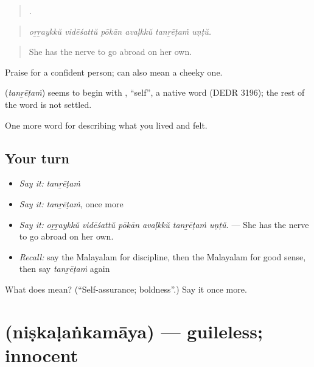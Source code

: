 \begin{quote}
     .
\end{quote}

\begin{quote}
\emph{oṟṟaykkŭ vidēśattŭ pōkān avaḷkkŭ tanṟēṭaṁ uṇṭŭ.}
\end{quote}

\begin{quote}
She has the nerve to go abroad on her own.
\end{quote}

Praise for a confident person;  can also mean a cheeky one.

\begin{cousinweb}
\textbf{} (\emph{tanṟēṭaṁ}) seems to begin with , \textquotedblleft{}self\textquotedblright{}, a native word (DEDR 3196); the rest of the word is not settled.
\end{cousinweb}

\begin{grammarlens}[title={What you've built}]
One more word for describing what you lived and felt.
\end{grammarlens}

\subsection*{Your turn}
\begin{itemize}
\raggedright
  \item \emph{Say it:} \emph{tanṟēṭaṁ}
  \item \emph{Say it:} \emph{tanṟēṭaṁ}, once more
  \item \emph{Say it:} \emph{oṟṟaykkŭ vidēśattŭ pōkān avaḷkkŭ tanṟēṭaṁ uṇṭŭ.} — She has the nerve to go abroad on her own.
  \item \emph{Recall:} say the Malayalam for discipline, then the Malayalam for good sense, then say \emph{tanṟēṭaṁ} again
\end{itemize}

\begin{tcolorbox}[breakable,colback=teal!4,colframe=teal!35!black,title={Before you move on}]
What does  mean? (\textquotedblleft{}Self-assurance; boldness\textquotedblright{}.) Say it once more.
\end{tcolorbox}
\section[\texorpdfstring{\ml{നിഷ്കളങ്കമായ} (niṣkaḷaṅkamāya)}{നിഷ്കളങ്കമായ (niṣkaḷaṅkamāya)}]{ (niṣkaḷaṅkamāya) — guileless; innocent}

